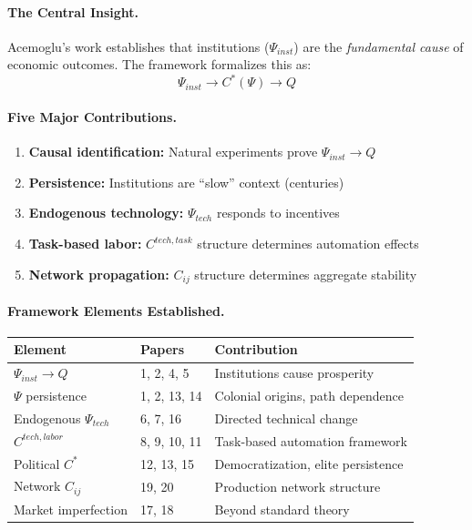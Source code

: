 \paragraph{The Central Insight.}
Acemoglu's work establishes that institutions ($\Psi_{inst}$) are the
\emph{fundamental cause} of economic outcomes. The framework formalizes
this as:
\begin{equation}
  \Psi_{inst} \to C^*(\Psi) \to Q
\end{equation}

\paragraph{Five Major Contributions.}

\begin{enumerate}
  \item \textbf{Causal identification:} Natural experiments prove $\Psi_{inst} \to Q$
  \item \textbf{Persistence:} Institutions are ``slow'' context (centuries)
  \item \textbf{Endogenous technology:} $\Psi_{tech}$ responds to incentives
  \item \textbf{Task-based labor:} $C^{tech,task}$ structure determines automation effects
  \item \textbf{Network propagation:} $C_{ij}$ structure determines aggregate stability
\end{enumerate}

\paragraph{Framework Elements Established.}

\begin{center}
\renewcommand{\arraystretch}{1.2}
\small
\begin{tabular}{lll}
\hline
\textbf{Element} & \textbf{Papers} & \textbf{Contribution} \\
\hline
$\Psi_{inst} \to Q$ & 1, 2, 4, 5 & Institutions cause prosperity \\
$\Psi$ persistence & 1, 2, 13, 14 & Colonial origins, path dependence \\
Endogenous $\Psi_{tech}$ & 6, 7, 16 & Directed technical change \\
$C^{tech,labor}$ & 8, 9, 10, 11 & Task-based automation framework \\
Political $C^*$ & 12, 13, 15 & Democratization, elite persistence \\
Network $C_{ij}$ & 19, 20 & Production network structure \\
Market imperfection & 17, 18 & Beyond standard theory \\
\hline
\end{tabular}
\end{center}

